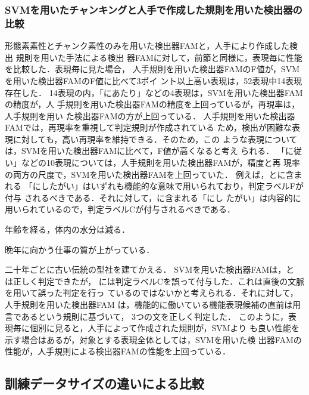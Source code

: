 \documentclass[japanese]{jnlp_1.2d}
\newcommand{\uline}[1]{}
\newcounter{example}
\newenvironment{example}{}{}
\newcommand{\strref}[1]{}
\begin{document}
\subsubsection{SVMを用いたチャンキングと人手で作成した規則を用いた検出器の比較}

形態素素性とチャンク素性のみを用いた検出器FAMと，人手により作成した検出
規則を用いた手法\cite{形態素情報を用いた日本語機能表現の検出}による検出
器FAMに対して，前節と同様に，表現毎に性能を比較した．表現毎に見た場合，
人手規則を用いた検出器FAMのF値が，SVMを用いた検出器FAMのF値に比べて3ポイ
ント以上高い表現は，52表現中14表現存在した．
14表現の内，「にあたり」などの4表現は，SVMを用いた検出器FAMの精度が，人
手規則を用いた検出器FAMの精度を上回っているが，再現率は，人手規則を用い
た検出器FAMの方が上回っている．
人手規則を用いた検出器FAMでは，再現率を重視して判定規則が作成されている
ため，検出が困難な表現に対しても，高い再現率を維持できる．そのため，この
ような表現については，SVMを用いた検出器FAMに比べて，F値が高くなると考え
られる．
「に従い」などの10表現については，人手規則を用いた検出器FAMが，精度と再
現率の両方の尺度で，SVMを用いた検出器FAMを上回っていた．
例えば，\strref{ex:nishitagai-F}と\strref{ex:nishitagai-F2}に含まれる
「にしたがい」はいずれも機能的な意味で用いられており，判定ラベルFが付与
されるべきである．それに対して，\strref{ex:nishitagai-C}に含まれる「にし
たがい」は内容的に用いられているので，判定ラベルCが付与されるべきである．
\begin{example}
  \item 年齢を経る{\kern0pt}\uline{にしたがい}，体内の水分は減る．\label{ex:nishitagai-F}
  \item 晩年に向かう{\kern0pt}\uline{にしたがい}{\kern0pt}仕事の質が上がっている．\label{ex:nishitagai-F2}
  \item 二十年ごとに古い伝統の型{\kern0pt}\uline{にしたがい}{\kern0pt}社を建てかえる．\label{ex:nishitagai-C}
\end{example}
SVMを用いた検出器FAMは，\strref{ex:nishitagai-F}と
\strref{ex:nishitagai-C}は正しく判定できたが，\strref{ex:nishitagai-F2} 
には判定ラベルCを誤って付与した．これは直後の文脈を用いて誤った判定を行っ
ているのではないかと考えられる．それに対して，人手規則を用いた検出器FAM 
は，機能的に働いている機能表現候補の直前は用言であるという規則に基づいて，
3つの文を正しく判定した．
このように，表現毎に個別に見ると，人手によって作成された規則が，SVMより
も良い性能を示す場合はあるが，対象とする表現全体としては，SVMを用いた検
出器FAMの性能が，人手規則による検出器FAMの性能を上回っている．


\subsection{訓練データサイズの違いによる比較}
\end{document}
